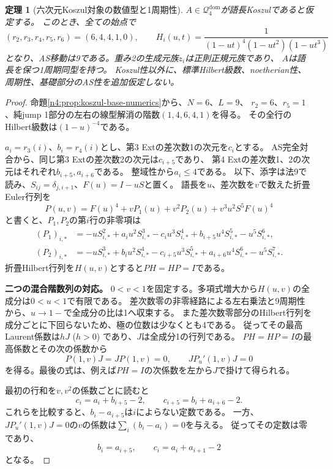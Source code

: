 \documentclass[11pt,a4paper]{ltjsarticle}
\newtheorem{theorem}{定理}[section]
\theoremstyle{definition}
\begin{document}
\begin{theorem}[六次元Koszul対象の数値型と1周期性]
\label{n4:thm:koszul-numerics-period}
$A\in\mathcal Q_4^{\mathrm{dom}}$が語長Koszulであると仮定する。
このとき、全ての始点で
\[
(r_2,r_3,r_4,r_5,r_6)=(6,4,4,1,0),\qquad
H_i(u,t)=\frac1{(1-ut)^4(1-ut^2)(1-ut^3)}
\]
となり、AS移動は9である。重み2の生成元族$z_i$は正則正規元族であり、
$A$は語長を保つ1周期同型を持つ。
Koszul性以外に、標準Hilbert級数、noetherian性、周期性、基礎部分のAS性を追加仮定しない。
\end{theorem}
\begin{proof}
命題\ref{n4:prop:koszul-base-numerics}から、$N=6$、$L=9$、
$r_2=6$、$r_5=1$、純jump 1部分の左右の線型解消の階数$(1,4,6,4,1)$を得る。
その全行のHilbert級数は$(1-u)^{-4}$である。

$a_i=r_3(i)$、$b_i=r_4(i)$とし、第3 Extの差次数1の次元を$c_i$とする。
AS完全対合から、同じ第3 Extの差次数2の次元は$c_{i+5}$であり、
第4 Extの差次数1、2の次元はそれぞれ$b_{i+5},a_{i+6}$である。
整域性から$a_i\le4$である。
以下、添字は法9で読み、$S_{ij}=\delta_{j,i+1}$、$F(u)=I-uS$と置く。
語長を$u$、差次数を$v$で数えた折畳Euler行列を
\[
P(u,v)=F(u)^4+vP_1(u)+v^2P_2(u)+v^3u^2S^5F(u)^4
\]
と書くと、$P_1,P_2$の第$i$行の非零項は
\begin{align*}
(P_1)_{i,*}&=-uS^2_{i,*}+a_i u^2S^3_{i,*}-c_i u^3S^4_{i,*}
+b_{i+5}u^4S^5_{i,*}-u^5S^6_{i,*},\\
(P_2)_{i,*}&=-uS^3_{i,*}+b_i u^2S^4_{i,*}-c_{i+5}u^3S^5_{i,*}
+a_{i+6}u^4S^6_{i,*}-u^5S^7_{i,*}.
\end{align*}
折畳Hilbert行列を$H(u,v)$とすると$PH=HP=I$である。

\par\smallskip\noindent\textbf{二つの混合階数列の対応。}\quad
$0<v<1$を固定する。多項式増大から$H(u,v)$の全成分は$0<u<1$で有限である。
差次数零の非零経路による左右乗法と9周期性から、$u\to1-$で全成分の比は1へ収束する。
また差次数零部分のHilbert行列を成分ごとに下回らないため、極の位数は少なくとも4である。
従ってその最高Laurent係数は$hJ$ ($h>0$) であり、$J$は全成分1の行列である。
$PH=HP=I$の最高係数とその次の係数から
\[
P(1,v)J=JP(1,v)=0,\qquad JP_u'(1,v)J=0
\]
を得る。最後の式は、例えば$PH=I$の次係数を左から$J$で掛けて得られる。

最初の行和を$v,v^2$の係数ごとに読むと
\[
c_i=a_i+b_{i+5}-2,\qquad c_{i+5}=b_i+a_{i+6}-2.
\]
これらを比較すると、$b_i-a_{i+5}$は$i$によらない定数である。
一方、$JP_u'(1,v)J=0$の$v$の係数は$\sum_i(b_i-a_i)=0$を与える。
従ってその定数は零であり、
\[
b_i=a_{i+5},\qquad c_i=a_i+a_{i+1}-2
\]
となる。


\end{proof}
\end{document}
